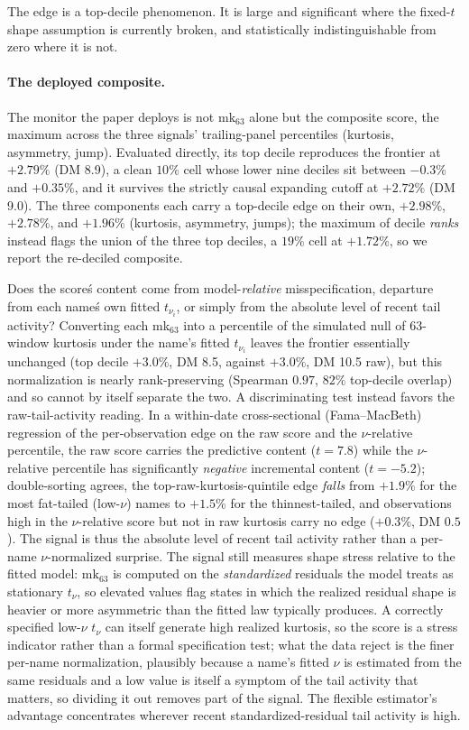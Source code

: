 \documentclass[11pt]{article}
\theoremstyle{remark}
\begin{document}
The edge is a top-decile phenomenon. It is large and significant
where the fixed-$t$ shape assumption is currently broken, and
statistically indistinguishable from zero where it is not.

\paragraph{The deployed composite.} The monitor the paper deploys is not
$\mathrm{mk}_{63}$ alone but the composite score, the maximum across the
three signals' trailing-panel percentiles (kurtosis, asymmetry, jump).
Evaluated directly, its top decile reproduces the frontier at $+2.79\%$
(DM 8.9), a clean $10\%$ cell whose lower nine deciles sit between
$-0.3\%$ and $+0.35\%$, and it survives the strictly causal expanding
cutoff at $+2.72\%$ (DM 9.0). The three components each carry a
top-decile edge on their own, $+2.98\%$, $+2.78\%$, and $+1.96\%$
(kurtosis, asymmetry, jumps); the maximum of decile \emph{ranks}
instead flags the union of the three top deciles, a $19\%$ cell at
$+1.72\%$, so we report the re-deciled composite.

Does the score\'s content come from model-\emph{relative}
misspecification, departure from each name\'s own fitted $t_{\nu_i}$, or
simply from the absolute level of recent tail activity? Converting each
mk$_{63}$ into a percentile of the simulated null of 63-window kurtosis
under the name's fitted $t_{\nu_i}$ leaves the frontier essentially
unchanged (top decile $+3.0\%$, DM 8.5, against $+3.0\%$, DM 10.5 raw),
but this normalization is nearly rank-preserving (Spearman $0.97$, $82\%$
top-decile overlap) and so cannot by itself separate the two. A
discriminating test instead favors the raw-tail-activity reading.
In a within-date cross-sectional (Fama--MacBeth) regression of the
per-observation edge on the raw score and the $\nu$-relative percentile,
the raw score carries the predictive content ($t=7.8$) while the
$\nu$-relative percentile has significantly \emph{negative} incremental
content ($t=-5.2$); double-sorting agrees, the top-raw-kurtosis-quintile
edge \emph{falls} from $+1.9\%$ for the most fat-tailed (low-$\nu$) names
to $+1.5\%$ for the thinnest-tailed, and observations high in the
$\nu$-relative score but not in raw kurtosis carry no edge ($+0.3\%$, DM
$0.5$). The signal is thus the absolute level of recent tail activity rather than
a per-name $\nu$-normalized surprise. The signal still measures shape
stress relative to the fitted model: $\mathrm{mk}_{63}$ is computed on the
\emph{standardized} residuals the model treats as stationary $t_\nu$, so
elevated values flag states in which the realized residual shape is
heavier or more asymmetric than the fitted law typically produces. A
correctly specified low-$\nu$ $t_\nu$ can itself generate high realized
kurtosis, so the score is a stress indicator rather than a formal
specification test; what the data reject is the finer per-name
normalization, plausibly because a name's fitted $\nu$ is estimated from
the same residuals and a low value is itself a symptom of the tail
activity that matters, so dividing it out removes part of the signal. The
flexible estimator's advantage concentrates wherever recent
standardized-residual tail activity is high.
\end{document}
